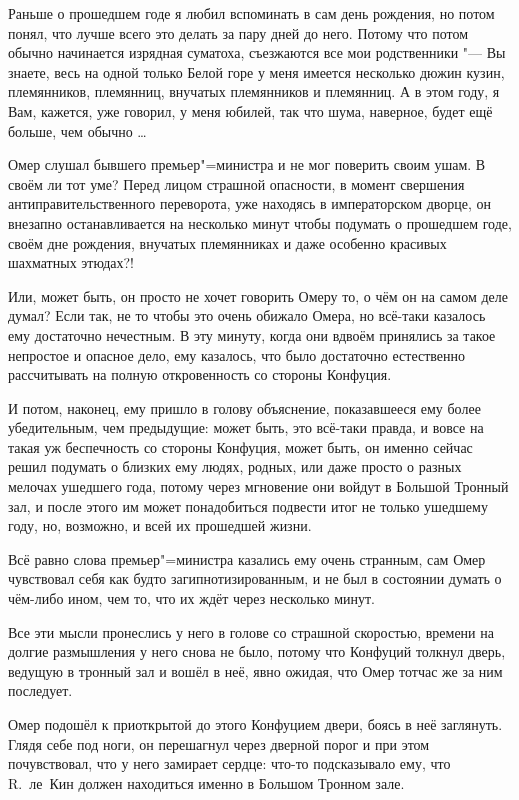 Раньше о прошедшем годе я любил вспоминать в сам день рождения, но потом понял,
что лучше всего это делать за пару дней до него.
Потому что потом обычно начинается изрядная суматоха, съезжаются все мои
родственники "--- Вы знаете, весь на одной только Белой горе у меня имеется
несколько дюжин кузин, племянников, племянниц, внучатых племянников и племянниц.
А в этом году, я Вам, кажется, уже говорил, у меня юбилей, так что шума,
наверное, будет ещё больше, чем обычно \ldots

Омер слушал бывшего премьер"=министра и не мог поверить своим ушам.
В своём ли тот уме?
Перед лицом страшной опасности, в момент свершения антиправительственного
переворота, уже находясь в императорском дворце, он внезапно останавливается на
несколько минут чтобы подумать о прошедшем годе, своём дне рождения, внучатых
племянниках и даже особенно красивых шахматных этюдах?!

Или, может быть, он просто не хочет говорить Омеру то, о чём он на самом деле
думал?
Если так, не то чтобы это очень обижало Омера, но всё-таки казалось ему
достаточно нечестным.
В эту минуту, когда они вдвоём принялись за такое непростое и опасное дело, ему
казалось, что было достаточно естественно рассчитывать на полную откровенность
со стороны Конфуция.

И потом, наконец, ему пришло в голову объяснение, показавшееся ему более
убедительным, чем предыдущие: может быть, это всё-таки правда, и вовсе на такая
уж беспечность со стороны Конфуция, может быть, он именно сейчас решил подумать
о близких ему людях, родных, или даже просто о разных мелочах ушедшего года,
потому через мгновение они войдут в Большой Тронный зал, и после этого им может
понадобиться подвести итог не только ушедшему году, но, возможно, и всей их
прошедшей жизни.

Всё равно слова премьер"=министра казались ему очень странным, сам Омер
чувствовал себя как будто загипнотизированным, и не был в состоянии думать о
чём-либо ином, чем то, что их ждёт через несколько минут.

Все эти мысли пронеслись у него в голове со страшной скоростью, времени на
долгие размышления у него снова не было, потому что Конфуций толкнул дверь,
ведущую в тронный зал и вошёл в неё, явно ожидая, что Омер тотчас же за ним
последует.

Омер подошёл к приоткрытой до этого Конфуцием двери, боясь в неё заглянуть.
Глядя себе под ноги, он перешагнул через дверной порог и при этом почувствовал,
что у него замирает сердце: что-то подсказывало ему, что R.~ле~Кин должен
находиться именно в Большом Тронном зале.

